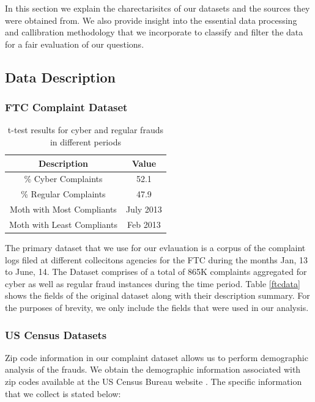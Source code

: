 \documentclass[conference]{IEEEtran}
\begin{document}
In this section we explain the charectarisitcs of our datasets and the sources they were obtained from. We also provide insight into the essential data processing and callibration methodology that we incorporate to classify and filter the data for a fair evaluation of our questions.

\subsection{Data Description}

\subsubsection{FTC Complaint Dataset}

\begin{table}[h]
\centering
\begin{tabular}{c|c}
\hline
{\bfseries Description} & \multicolumn{1}{c}{\bfseries Value}
\\
\hline
\hline
\% Cyber Complaints &52.1\\
\hline
\% Regular Complaints & 47.9\\
\hline
Moth with Most Compliants & July 2013\\
\hline
Moth with Least Compliants & Feb 2013\\
\hline
\end{tabular}
\vspace{8pt}
\caption{t-test results for cyber and regular frauds in different periods}\label{ttest}
\vspace{-10pt}
\end{table}


The primary dataset that we use for our evlauation is a corpus of the complaint logs filed at different collecitons agencies for the FTC during the months Jan, 13 to June, 14. The Dataset comprises of a total of 865K complaints aggregated for cyber as well as regular fraud instances during the time period. Table \ref{ftcdata} shows the fields of the original dataset along with their description summary. For the purposes of brevity, we only include the fields that were used in our analysis.
\\
\subsubsection{US Census Datasets}
Zip code information in our complaint dataset allows us to perform demographic analysis of the frauds. We obtain the demographic information associated with zip codes available at the US Census Bureau website \cite{usbureau}. The specific information that we collect is stated below:
\end{document}
